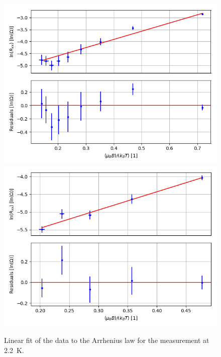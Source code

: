 \documentclass[12pt,a4paper]{article}
\begin{document}
\begin{figure} [H]
\centering
\includegraphics[scale=0.5]{Bilder/Elektron_g/4_2/lin_fit_Arrhenius_law_1.PNG}
\includegraphics[scale=0.5]{Bilder/Elektron_g/4_2/lin_fit_Arrhenius_law_2.PNG}
\caption{Linear fit of the data to the Arrhenius law for the measurement at \SI{2.2}{K}.}
\end{figure}
\end{document}
